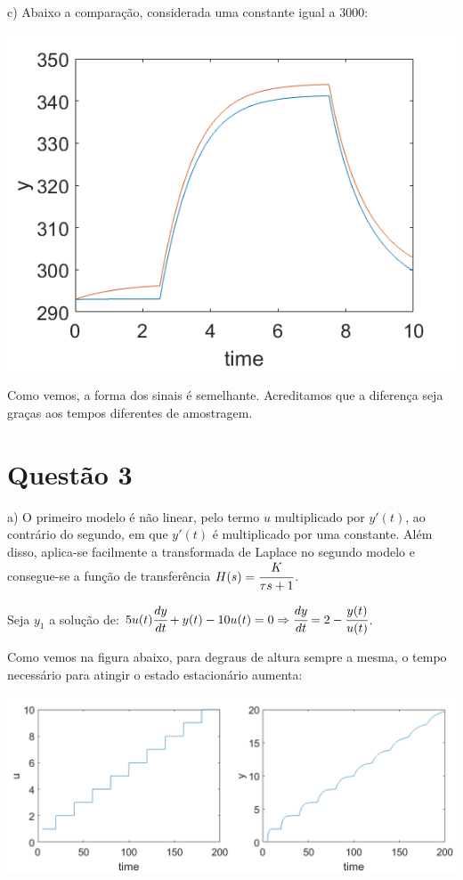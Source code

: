 \documentclass{rbfin}
\begin{document}
\newpage

c) Abaixo a comparação, considerada uma constante igual a $3000$:

\begin{center}
\includegraphics[scale=1]{comparacao}
\end{center}

Como vemos, a forma dos sinais é semelhante. Acreditamos que a diferença seja graças aos tempos diferentes de amostragem.

\section*{Questão 3}

a) O primeiro modelo é não linear, pelo termo $u$ multiplicado por $y'(t)$, ao contrário do segundo, em que $y'(t)$ é multiplicado por uma constante. Além disso, aplica-se facilmente a transformada de Laplace no segundo modelo e consegue-se a função de transferência $H(s) = \cfrac{K}{\tau s + 1}$.

Seja $y_1$ a solução de: $5 u(t) \cfrac{dy}{dt} + y(t) - 10 u(t) = 0 \Rightarrow \cfrac{dy}{dt} = 2 - \cfrac{y(t)}{u(t)}$.

Como vemos na figura abaixo, para degraus de altura sempre a mesma, o tempo necessário para atingir o estado estacionário aumenta: 

\begin{center}
\includegraphics[scale=0.65]{q3y1}
\end{center}
\end{document}
